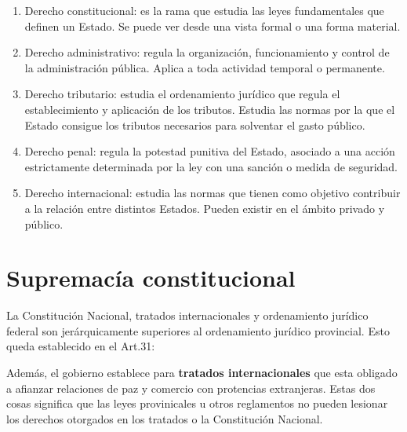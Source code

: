 \documentclass[../resumen.tex]{subfiles}
\begin{document}
\begin{enumerate}
  \item Derecho constitucional: es la rama que estudia las leyes fundamentales 
    que definen un Estado. Se puede ver desde una vista formal o una forma material.
  \item Derecho administrativo: regula la organización, funcionamiento y control
    de la administración pública. Aplica a toda actividad temporal o permanente.
  \item Derecho tributario: estudia el ordenamiento jurídico que regula el 
    establecimiento y aplicación de los tributos. Estudia las normas por la que
    el Estado consigue los tributos necesarios para solventar el gasto público.
  \item Derecho penal: regula la potestad punitiva del Estado, asociado a una 
    acción estrictamente determinada por la ley con una sanción o medida de seguridad.
  \item Derecho internacional: estudia las normas que tienen como objetivo 
    contribuir a la relación entre distintos Estados. Pueden existir en el ámbito privado y público.
\end{enumerate}

\section{Supremacía constitucional}

La Constitución Nacional, tratados internacionales y ordenamiento jurídico federal
son jerárquicamente superiores al ordenamiento jurídico provincial. Esto queda 
establecido en el Art.31:

\vspace{0.333cm}
\begin{center}
\end{center}
\vspace{0.3cm}

Además, el gobierno establece para \textbf{tratados internacionales} que esta obligado
a afianzar relaciones de paz y comercio con protencias extranjeras. Estas dos 
cosas significa que las leyes provinicales u otros reglamentos no pueden lesionar
los derechos otorgados en los tratados o la Constitución Nacional. 
\end{document}
